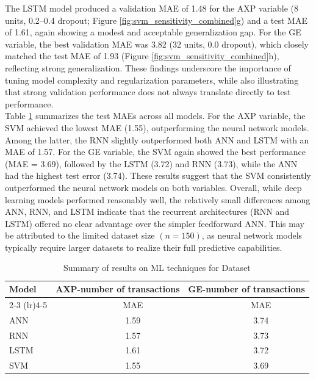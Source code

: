 \documentclass[twoside]{article}
\begin{document}
The LSTM model produced a validation MAE of 1.48 for the AXP variable (8 units, 0.2–0.4 dropout; Figure \ref{fig:svm_sensitivity_combined}g) and a test MAE of 1.61, again showing a modest and acceptable generalization gap. For the GE variable, the best validation MAE was 3.82 (32 units, 0.0 dropout), which closely matched the test MAE of 1.93 (Figure \ref{fig:svm_sensitivity_combined}h), reflecting strong generalization. These findings underscore the importance of tuning model complexity and regularization parameters, while also illustrating that strong validation performance does not always translate directly to test performance.\\
 Table \ref{ML results dataset } summarizes the test MAEs across all models. For the AXP variable, the SVM achieved the lowest MAE (1.55), outperforming the neural network models. Among the latter, the RNN slightly outperformed both ANN and LSTM with an MAE of 1.57. For the GE variable, the SVM again showed the best performance (MAE = 3.69), followed by the LSTM (3.72) and RNN (3.73), while the ANN had the highest test error (3.74). These results suggest that the SVM consistently outperformed the neural network models on both variables. Overall, while deep learning models performed reasonably well, the relatively small differences among ANN, RNN, and LSTM indicate that the recurrent architectures (RNN and LSTM) offered no clear advantage over the simpler feedforward ANN. This may be attributed to the limited dataset size $(n=150)$, as neural network models typically require larger datasets to realize their full predictive capabilities.
\begin{table}   [h]
\centering
\caption{Summary of results on ML techniques for Dataset }
\label{ML results dataset }
\begin{tabular}{lcccc}
\toprule
\textbf{Model} & \multicolumn{2}{c}{\textbf{AXP-number of transactions}} & \multicolumn{2}{c}{\textbf{GE-number of transactions}} \\
\cmidrule(lr){2-3} \cmidrule(lr){4-5}
 &  & MAE &  & MAE \\
\midrule
ANN  &     &   1.59   &      &  3.74    \\
RNN  &     &   1.57   &      &  3.73    \\
LSTM &     &   1.61   &      &  3.72    \\
SVM  &    &  1.55    &       &  3.69    \\
\bottomrule
\end{tabular}
\end{table}
\end{document}
